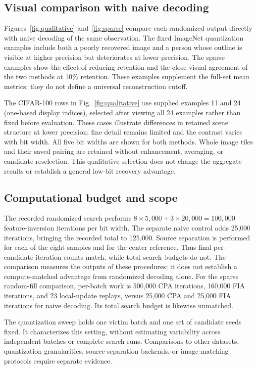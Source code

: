 \documentclass{article}
\begin{document}
\subsection{Visual comparison with naive decoding}
\label{sec:qualitative}
Figures~\ref{fig:qualitative} and~\ref{fig:sparse} compare each randomized
output directly with naive decoding of the same observation. The fixed
ImageNet quantization examples include both a poorly recovered image and a person
whose outline is visible at higher precision but deteriorates at lower
precision. The sparse examples show the effect of reducing retention and
the close visual agreement of the two methods at 10\% retention.
These examples supplement the full-set mean metrics; they do not define
a universal reconstruction cutoff.

The CIFAR-100 rows in Fig.~\ref{fig:qualitative} use supplied examples
11 and 24 (one-based display indices), selected after viewing all 24
examples rather than fixed before evaluation. These cases illustrate
differences in retained scene structure at lower precision; fine detail
remains limited and the contrast varies with bit width. All five bit
widths are shown for both methods. Whole image tiles and their saved
pairing are retained without enhancement, averaging, or candidate
reselection. This qualitative selection does not change the aggregate
results or establish a general low-bit recovery advantage.

\subsection{Computational budget and scope}
\label{sec:budget}
The recorded randomized search performs
$8\times5{,}000+3\times20{,}000=100{,}000$ feature-inversion iterations
per bit width. The separate naive control adds 25,000 iterations,
bringing the recorded total to 125,000. Source separation is performed
for each of the eight samples and for the center reference. Thus final
per-candidate iteration counts match, while total search budgets do not.
The comparison measures the outputs of these procedures; it does not
establish a compute-matched advantage from randomized decoding alone.
For the sparse random-fill comparison, per-batch work is 500,000 CPA
iterations, 160,000 FIA iterations, and 23 local-update replays, versus
25,000 CPA and 25,000 FIA iterations for naive decoding. Its total search
budget is likewise unmatched.

The quantization sweep holds one victim batch and one set of candidate seeds fixed.
It characterizes this setting, without estimating variability across
independent batches or complete search runs. Comparisons to other
datasets, quantization granularities, source-separation backends, or
image-matching protocols require separate evidence.
\end{document}
